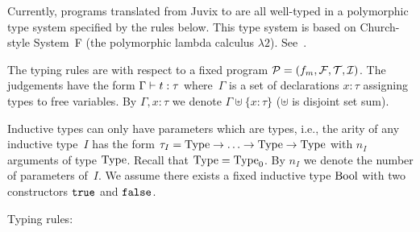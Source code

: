 \documentclass[
    9pt,            %
    techreport,        %
    affiltop,       %
]{art}
\begin{document}
Currently, programs translated from Juvix to \JuvixCore{} are all
well-typed in a polymorphic type system specified by the rules below. This
type system is based on Church-style System~F (the polymorphic lambda
calculus $\lambda2$). See~\cite[Section~5]{lambda-calculi-with-types}.

The typing rules are with respect to a fixed \JuvixCore{} program $\mathcal{P} =
(f_m, \mathcal{F}, \mathcal{T}, \mathcal{I})$. The judgements have the form $\Gamma \vdash t :
\tau$ where~$\Gamma$ is a set of declarations $x : \tau$ assigning types to
free variables. By $\Gamma, x : \tau$ we denote $\Gamma \uplus \{x :
\tau\}$ ($\uplus$ is disjoint set sum).

Inductive types can only have parameters which are types, i.e., the arity
of any inductive type~$I$ has the form $\tau_I = \mathrm{Type} \to \ldots \to \mathrm{Type}
\to \mathrm{Type}$ with $n_I$ arguments of type $\mathrm{Type}$. Recall that $\mathrm{Type} =
\mathrm{Type}_0$. By $n_I$ we denote the number of parameters of~$I$. We assume
there exists a fixed inductive type $\mathrm{Bool}$ with two constructors $\mathtt{true}$
and $\mathtt{false}$.

Typing rules:
\end{document}
